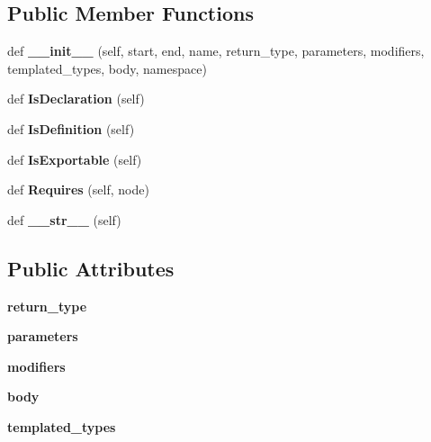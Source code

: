 \subsection*{Public Member Functions}
\begin{DoxyCompactItemize}
\item 
\mbox{\label{classcpp_1_1ast_1_1_function_ab5270f5d353ec5e9dcd136e4cc6c7f6c}} 
def {\bfseries \+\_\+\+\_\+init\+\_\+\+\_\+} (self, start, end, name, return\+\_\+type, parameters, modifiers, templated\+\_\+types, body, namespace)
\item 
\mbox{\label{classcpp_1_1ast_1_1_function_ab9120d9a774eb5860d220b3bcdcaa87e}} 
def {\bfseries Is\+Declaration} (self)
\item 
\mbox{\label{classcpp_1_1ast_1_1_function_ad5d96144bd8418ac72332bffb21ea86f}} 
def {\bfseries Is\+Definition} (self)
\item 
\mbox{\label{classcpp_1_1ast_1_1_function_a85a073cd69116bc6191f379d69d10d72}} 
def {\bfseries Is\+Exportable} (self)
\item 
\mbox{\label{classcpp_1_1ast_1_1_function_a999e7b5e43517cd4d68b1aeea8a7d6e1}} 
def {\bfseries Requires} (self, node)
\item 
\mbox{\label{classcpp_1_1ast_1_1_function_aaef91d6a3b1eb2703eebb32d39c45978}} 
def {\bfseries \+\_\+\+\_\+str\+\_\+\+\_\+} (self)
\end{DoxyCompactItemize}
\subsection*{Public Attributes}
\begin{DoxyCompactItemize}
\item 
\mbox{\label{classcpp_1_1ast_1_1_function_af750fd788d7ab33163ee066534780212}} 
{\bfseries return\+\_\+type}
\item 
\mbox{\label{classcpp_1_1ast_1_1_function_a0e61ef47af9cf2fd4402dbd8cab631ef}} 
{\bfseries parameters}
\item 
\mbox{\label{classcpp_1_1ast_1_1_function_ad30eed435f1ff9ff34ade9cc0d7be121}} 
{\bfseries modifiers}
\item 
\mbox{\label{classcpp_1_1ast_1_1_function_a8e25e5016b23b38e32acf2df529c0650}} 
{\bfseries body}
\item 
\mbox{\label{classcpp_1_1ast_1_1_function_a57bb03218bade3240137a0d91c467cb6}} 
{\bfseries templated\+\_\+types}
\end{DoxyCompactItemize}


